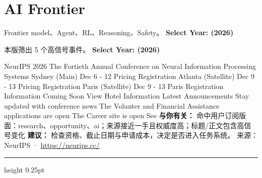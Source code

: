 \documentclass[10.5pt]{ctexart}
\begin{document}
\section*{AI Frontier}
{\color{ormuted} Frontier model、Agent、RL、Reasoning、Safety。}
\vspace{2mm}
{\LARGE\bfseries Select Year: (2026)}\par
\vspace{1mm}
{\color{ormuted} 本版筛出 5 个高信号事件。}
\vspace{3mm}
{\Large\bfseries Select Year: (2026)}\par
NeurIPS 2026 The Fortieth Annual Conference on Neural Information Processing Systems Sydney (Main) Dec 6 - 12 Pricing Registration Atlanta (Satellite) Dec 9 - 13 Pricing Registration Paris (Satellite) Dec 9 - 13 Paris Registration Information Coming Soon View Hotel Information Latest Announcements Stay updated with conference news The Volunter and Financial Assistance applications are open The Career site is open See
\textbf{与你有关：} 命中用户订阅版面：research、opportunity、ai；来源接近一手且权威度高；标题/正文包含高信号变化
\textbf{建议：} 检查资格、截止日期与申请成本，决定是否进入任务系统。
{\footnotesize\color{ormuted} 来源：NeurIPS · \url{https://neurips.cc/}}
\vspace{4mm}
\hrule height 0.25pt
\vspace{3mm}
\end{document}
